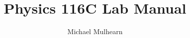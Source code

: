 \documentclass[12pt,oneside]{book}
\theoremstyle{definition}
\begin{document}

\title{Physics 116C Lab Manual}
\author{Michael Mulhearn}
\maketitle

\tableofcontents







\end{document}
